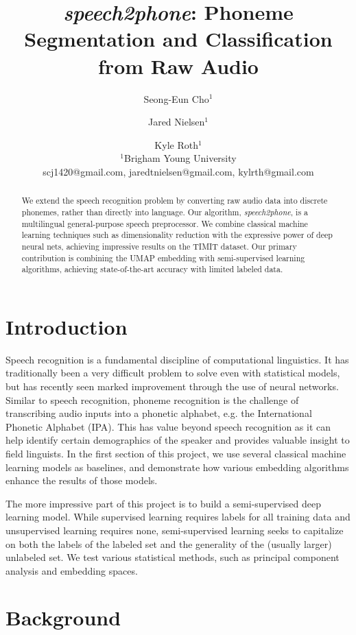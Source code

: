 \documentclass{article}
\title{\textit{speech2phone}: Phoneme Segmentation and Classification from Raw Audio}
\author{
Seong-Eun Cho$^1$\and
Jared Nielsen$^1$\and
Kyle Roth$^1$\\
\affiliations
$^1$Brigham Young University\\
\emails
scj1420@gmail.com,
jaredtnielsen@gmail.com,
kylrth@gmail.com
}
\begin{document}
\maketitle

\begin{abstract}
We extend the speech recognition problem by converting raw audio data into discrete phonemes, rather than directly into language. Our algorithm, \textit{speech2phone}, is a multilingual general-purpose speech preprocessor. We combine classical machine learning techniques such as dimensionality reduction with the expressive power of deep neural nets, achieving impressive results on the TIMIT dataset. Our primary contribution is combining the UMAP embedding with semi-supervised learning algorithms, achieving state-of-the-art accuracy with limited labeled data.
\end{abstract}

\section{Introduction}
Speech recognition is a fundamental discipline of computational linguistics. It has traditionally been a very difficult problem to solve even with statistical models, but has recently seen marked improvement through the use of neural networks. Similar to speech recognition, phoneme recognition is the challenge of transcribing audio inputs into a phonetic alphabet, e.g. the International Phonetic Alphabet (IPA). This has value beyond speech recognition as it can help identify certain demographics of the speaker and provides valuable insight to field linguists. In the first section of this project, we use several classical machine learning models as baselines, and demonstrate how various embedding algorithms enhance the results of those models.

The more impressive part of this project is to build a semi-supervised deep learning model. While supervised learning requires labels for all training data and unsupervised learning requires none, semi-supervised learning seeks to capitalize on both the labels of the labeled set and the generality of the (usually larger) unlabeled set. We test various statistical methods, such as principal component analysis and embedding spaces.

\section{Background}
\end{document}
